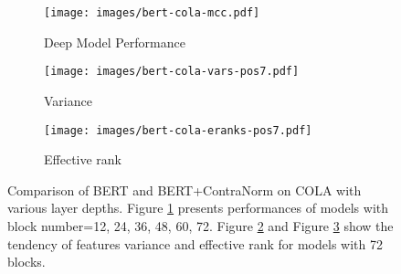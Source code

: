 \documentclass{article}
\theoremstyle{definition}
\theoremstyle{remark}
\theoremstyle{theorem}
\begin{document}
\begin{figure}
     \centering
     \begin{subfigure}[b]{0.3\textwidth}
         \centering
         \texttt{[image: images/bert-cola-mcc.pdf]}
         \caption{Deep Model Performance}
         \label{fig:cola-acc}
     \end{subfigure}
     \begin{subfigure}[b]{0.3\textwidth}
         \centering
         \texttt{[image: images/bert-cola-vars-pos7.pdf]}
         \caption{Variance}
         \label{fig:cola-var}
     \end{subfigure}
     \begin{subfigure}[b]{0.3\textwidth}
         \centering
         \texttt{[image: images/bert-cola-eranks-pos7.pdf]}
         \caption{Effective rank}
         \label{fig:cola-effect}
     \end{subfigure}
     \hfill
     \vspace{-0.1 in}
    \caption{Comparison of BERT and BERT+ContraNorm on COLA with various layer depths. Figure \ref{fig:cola-acc} presents performances of models with block number=12, 24, 36, 48, 60, 72. Figure \ref{fig:cola-var} and Figure \ref{fig:cola-effect} show the tendency of features variance and effective rank for models with 72 blocks.}
    \label{fig:deep-cola}
    \vspace{-0.1 in}
\end{figure}
\end{document}

